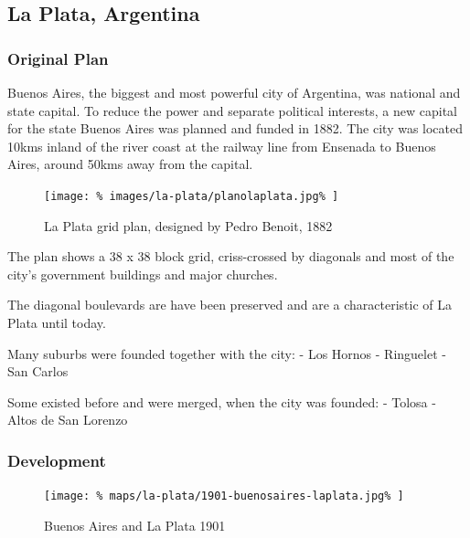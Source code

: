 \documentclass[twocolumn]{article}
\begin{document}
			
		\clearpage
		\begin{strip}
		\subsection{La Plata, Argentina}
		\end{strip}
		
			
			\subsubsection{Original Plan}
			Buenos Aires, the biggest and most powerful city of Argentina, was national and state capital. To reduce the power and separate political interests, a new capital for the state Buenos Aires was planned and funded in 1882.
			The city was located 10kms inland of the river coast at the railway line from Ensenada to Buenos Aires, around 50kms away from the capital.
			
			\begin{figure}[H]
				\texttt{[image: \%
					images/la-plata/planolaplata.jpg\%
				]}
				\caption{La Plata grid plan, designed by Pedro Benoit, 1882\cite{RecoletaCemetery:PedroBenoit}}
				\label{fig:img:plan-la-plata-1882}
			\end{figure}
			
			The plan shows a 38 x 38 block grid, criss-crossed by diagonals and most of the city’s government buildings and major churches.
			
			The diagonal boulevards are have been preserved and are a characteristic of La Plata until today.
			
			Many suburbs were founded together with the city:
			- Los Hornos
			- Ringuelet
			- San Carlos
			
			
			Some existed before and were merged, when the city was founded:
			- Tolosa
			- Altos de San Lorenzo
			
			
			
			\subsubsection{Development}
			
			
			\begin{figure}[H]
				\texttt{[image: \%
					maps/la-plata/1901-buenosaires-laplata.jpg\%
				]}
				\caption{Buenos Aires and La Plata 1901\cite{RiviereDeLaPlata}}
				\label{fig:map:buenosaires-la-plata-1901}
			\end{figure}
			
\end{document}

